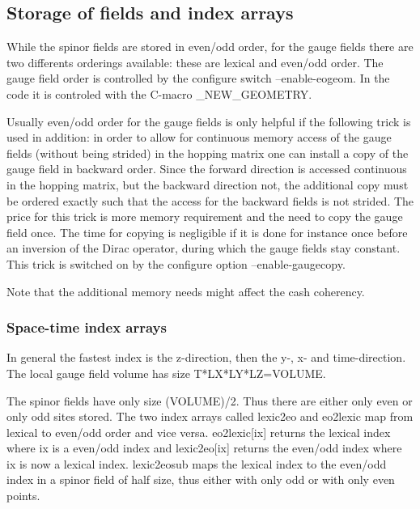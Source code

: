 \subsection{Storage of fields and index arrays}

While the spinor fields are stored in even/odd order, for the gauge
fields there are two differents orderings available: these are
lexical and even/odd order. The gauge field order is controlled
by the configure switch {\ttfamily --enable-eogeom}. In the code it is
controled with the C-macro {\ttfamily \_NEW\_GEOMETRY}.

Usually even/odd order for the gauge fields is only helpful if the
following trick is used in addition: in order to allow for continuous
memory access of the gauge fields (without being strided) in the
hopping matrix one can install a copy of the gauge field in backward
order. Since the forward direction is accessed continuous in the
hopping matrix, but the backward direction not, the additional copy
must be ordered exactly such that the access for the backward fields
is not strided. The price for this trick is more memory requirement
and the need to copy the gauge field once. The time for copying is
negligible if it is done for instance once before an inversion of the
Dirac operator, during which the gauge fields stay constant. This
trick is switched on by the configure option {\ttfamily
  --enable-gaugecopy}.

Note that the additional memory needs might affect the cash coherency.

\subsubsection{Space-time index arrays}

In general the fastest index is the z-direction, then the y-, x- and
time-direction. The local gauge field volume has size
{\ttfamily T*LX*LY*LZ=VOLUME}. 

The spinor fields have only size {\ttfamily (VOLUME)/2}. Thus
there are either only even or only odd sites stored. The two
index arrays called {\ttfamily lexic2eo} and {\ttfamily eo2lexic} map
from lexical to even/odd order and vice versa. {\ttfamily
  eo2lexic[ix]} returns the lexical index where {\ttfamily ix} is a
even/odd index and {\ttfamily lexic2eo[ix]} returns the even/odd index
where {\ttfamily ix} is now a lexical index. {\ttfamily lexic2eosub}
maps the lexical index to the even/odd index in a spinor field of half
size, thus either with only odd or with only even points.

